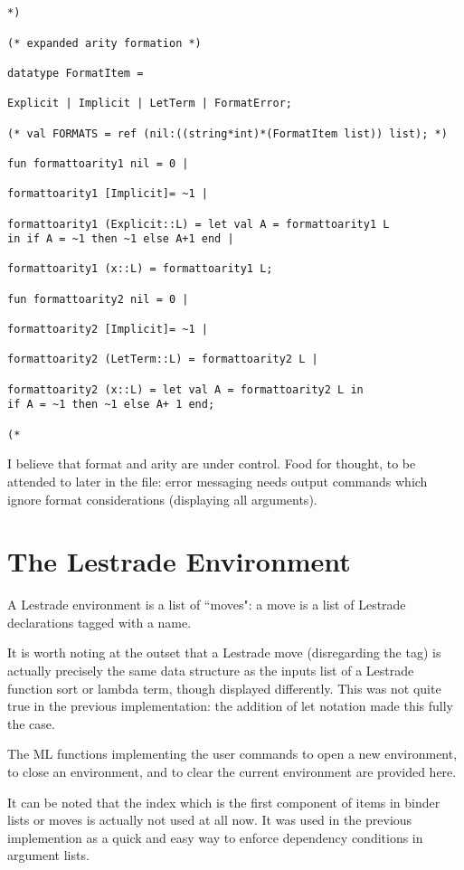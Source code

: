 \documentclass[12pt]{article}
\begin{document}
\begin{verbatim}


*)

(* expanded arity formation *)

datatype FormatItem =

Explicit | Implicit | LetTerm | FormatError;

(* val FORMATS = ref (nil:((string*int)*(FormatItem list)) list); *)

fun formattoarity1 nil = 0 |

formattoarity1 [Implicit]= ~1 |

formattoarity1 (Explicit::L) = let val A = formattoarity1 L 
in if A = ~1 then ~1 else A+1 end |

formattoarity1 (x::L) = formattoarity1 L;

fun formattoarity2 nil = 0 |

formattoarity2 [Implicit]= ~1 |

formattoarity2 (LetTerm::L) = formattoarity2 L |

formattoarity2 (x::L) = let val A = formattoarity2 L in
if A = ~1 then ~1 else A+ 1 end;

(*

\end{verbatim}

I believe that format and arity are under control.  Food for thought, to be attended to later in the file:  error messaging needs output commands which ignore format considerations (displaying all arguments).

\newpage

\section{The Lestrade Environment}

A Lestrade environment is a list of ``moves": a move is a list of Lestrade declarations tagged with a name.

It is worth noting at the outset that a Lestrade move (disregarding the tag) is actually precisely the same data structure as the inputs list of a Lestrade function sort or lambda term, though displayed differently.  This was not quite true in the previous implementation:
the addition of let notation made this fully the case.

The ML functions implementing the user commands to open a new environment, to close an environment, and to clear the current environment are provided here.

It can be noted that the index which is the first component of items in binder lists or moves is actually not used at all now.  It was used in the previous implemention
as a quick and easy way to enforce dependency conditions in argument lists.
\end{document}

